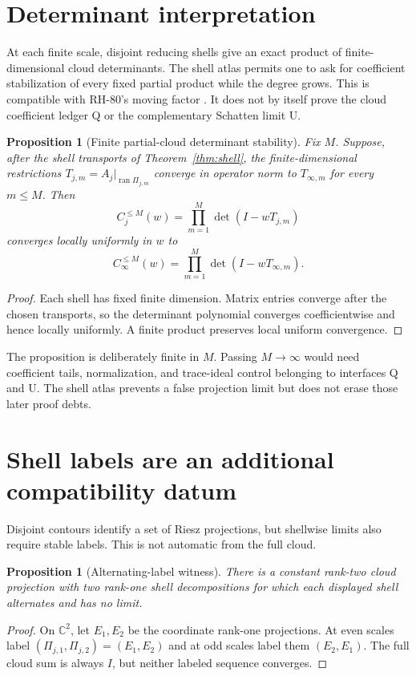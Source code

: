 \documentclass[12pt]{article}
\newtheorem{proposition}[theorem]{Proposition}
\begin{document}
\section{Determinant interpretation}
At each finite scale, disjoint reducing shells give an exact product of
finite-dimensional cloud determinants.  The shell atlas permits one to ask
for coefficient stabilization of every fixed partial product while the
degree grows.  This is compatible with RH-80's moving factor
\citep{WangRH80}.  It does not by itself prove the cloud coefficient ledger
Q or the complementary Schatten limit U.

\begin{proposition}[Finite partial-cloud determinant stability]
Fix $M$.  Suppose, after the shell transports of
Theorem~\ref{thm:shell}, the finite-dimensional restrictions
$T_{j,m}=A_j|_{\operatorname{ran}\Pi_{j,m}}$ converge in operator norm to
$T_{\infty,m}$ for every $m\le M$.  Then
\[
 C_j^{\le M}(w)=\prod_{m=1}^{M}\det(I-wT_{j,m})
\]
converges locally uniformly in $w$ to
\[
 C_\infty^{\le M}(w)=
 \prod_{m=1}^{M}\det(I-wT_{\infty,m}).
\]
\end{proposition}
\begin{proof}
Each shell has fixed finite dimension.  Matrix entries converge after the
chosen transports, so the determinant polynomial converges coefficientwise
and hence locally uniformly.  A finite product preserves local uniform
convergence.
\end{proof}

The proposition is deliberately finite in $M$.  Passing $M\to\infty$ would
need coefficient tails, normalization, and trace-ideal control belonging to
interfaces Q and U.  The shell atlas prevents a false projection limit but
does not erase those later proof debts.

\section{Shell labels are an additional compatibility datum}
Disjoint contours identify a set of Riesz projections, but shellwise limits
also require stable labels.  This is not automatic from the full cloud.

\begin{proposition}[Alternating-label witness]
There is a constant rank-two cloud projection with two rank-one shell
decompositions for which each displayed shell alternates and has no limit.
\end{proposition}
\begin{proof}
On $\mathbb C^2$, let $E_1,E_2$ be the coordinate rank-one projections.  At
even scales label $(\Pi_{j,1},\Pi_{j,2})=(E_1,E_2)$ and at odd scales label
them $(E_2,E_1)$.  The full cloud sum is always $I$, but neither labeled
sequence converges.
\end{proof}
\end{document}
